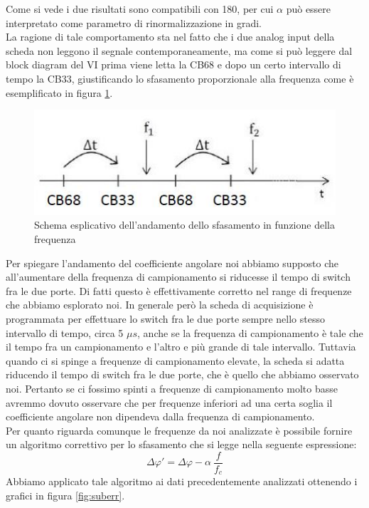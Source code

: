 \documentclass[journal, a4paper]{IEEEtran}
\begin{document}
Come si vede i due risultati sono compatibili con 180, per cui $\alpha$ può essere interpretato come parametro di rinormalizzazione in gradi.\\
La ragione di tale comportamento sta nel fatto che i due analog input della scheda non leggono il segnale contemporaneamente, ma come si può leggere dal block diagram del VI prima viene letta la CB68 e dopo un certo intervallo di tempo la CB33, giustificando lo sfasamento proporzionale alla frequenza come è esemplificato in figura \ref{fig:deltat}.

\begin{figure}[htp]
\centering
\includegraphics[scale=.55]{deltat}
\caption{Schema esplicativo dell'andamento dello sfasamento in funzione della frequenza}
\label{fig:deltat}
\end{figure}

Per spiegare l'andamento del coefficiente angolare noi abbiamo supposto che all'aumentare della frequenza di campionamento si riducesse il tempo di switch fra le due porte. Di fatti questo è effettivamente corretto nel range di frequenze che abbiamo esplorato noi. In generale però la scheda di acquisizione è programmata per effettuare lo switch fra le due porte sempre nello stesso intervallo di tempo, circa 5 $\mu s$, anche se la frequenza di campionamento è tale che il tempo fra un campionamento e l'altro e più grande di tale intervallo. Tuttavia quando ci si spinge a frequenze di campionamento elevate, la scheda si adatta riducendo il tempo di switch fra le due porte, che è quello che abbiamo osservato noi. Pertanto se ci fossimo spinti a frequenze di campionamento molto basse avremmo dovuto osservare che per frequenze inferiori ad una certa soglia il coefficiente angolare non dipendeva dalla frequenza di campionamento.\\

Per quanto riguarda comunque le frequenze da noi analizzate è possibile fornire un algoritmo correttivo per lo sfasamento che si legge nella seguente espressione:
\begin{equation}
\label{eqn:alg}
\Delta \varphi ' = \Delta \varphi - \alpha ~ \frac{f}{f_c}
\end{equation}
Abbiamo applicato tale algoritmo ai dati precedentemente analizzati ottenendo i grafici in figura \ref{fig:suberr}.
\end{document}
